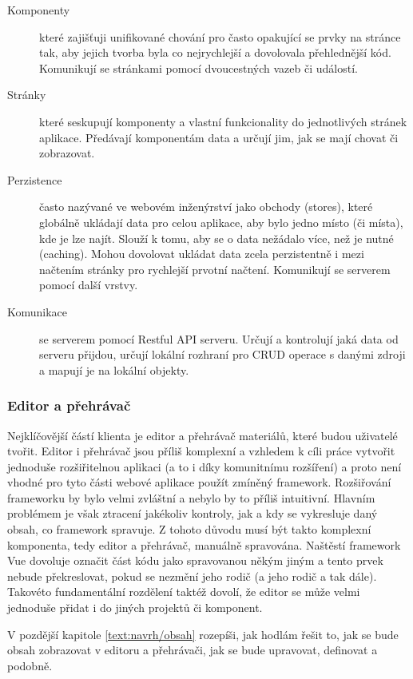 \begin{description}
    \item[Komponenty] které zajišťuji unifikované chování pro často opakující se prvky na stránce tak, aby jejich tvorba byla co nejrychlejší a dovolovala přehlednější kód. Komunikují se stránkami pomocí dvoucestných vazeb či událostí.
    \item[Stránky] které seskupují komponenty a vlastní funkcionality do jednotlivých stránek aplikace. Předávají komponentám data a určují jim, jak se mají chovat či zobrazovat.
    \item[Perzistence] často nazývané ve webovém inženýrství jako obchody (stores), které globálně ukládají data pro celou aplikace, aby bylo jedno místo (či místa), kde je lze najít. Slouží k tomu, aby se o data nežádalo více, než je nutné (caching). Mohou dovolovat ukládat data zcela perzistentně i mezi načtením stránky pro rychlejší prvotní načtení. Komunikují se serverem pomocí další vrstvy.
    \item[Komunikace] se serverem pomocí Restful API serveru. Určují a kontrolují jaká data od serveru přijdou, určují lokální rozhraní pro CRUD operace s danými zdroji a mapují je na lokální objekty.
\end{description}

\subsubsection{Editor a přehrávač}

Nejklíčovější částí klienta je editor a přehrávač materiálů, které budou uživatelé tvořit.
Editor i přehrávač jsou příliš komplexní a vzhledem k cíli práce vytvořit jednoduše rozšiřitelnou aplikaci (a to i díky komunitnímu rozšíření) a proto není vhodné pro tyto části webové aplikace použít zmíněný framework.
Rozšiřování frameworku by bylo velmi zvláštní a nebylo by to příliš intuitivní.
Hlavním problémem je však ztracení jakékoliv kontroly, jak a kdy se vykresluje daný obsah, co framework spravuje.
Z tohoto důvodu musí být takto komplexní komponenta, tedy editor a přehrávač, manuálně spravována.
Naštěstí framework Vue dovoluje označit část kódu jako spravovanou někým jiným a tento prvek nebude překreslovat, pokud se nezmění jeho rodič (a jeho rodič a tak dále). 
Takovéto fundamentální rozdělení taktéž dovolí, že editor se může velmi jednoduše přidat i do jiných projektů či komponent.

V pozdější kapitole \ref{text:navrh/obsah} rozepíši, jak hodlám řešit to, jak se bude obsah zobrazovat v editoru a přehrávači, jak se bude upravovat, definovat a podobně.

